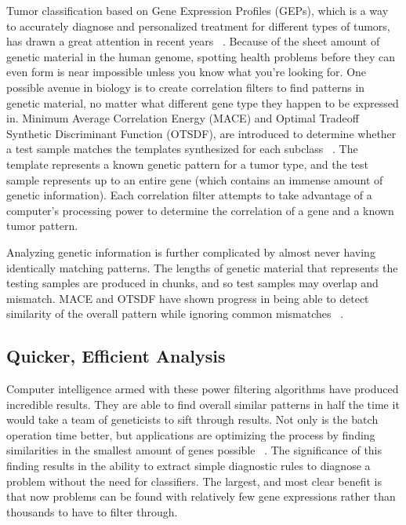 \documentclass[11pt]{article}
\newcommand{\tab}{\hspace*{2em}}
\begin{document}
\begin{doublespace}
\tab Tumor classification based on Gene Expression Profiles (GEPs), which is a way to accurately diagnose 
and personalized treatment for different types of tumors, has drawn a great attention in 
recent years ~\cite{Wang:2012:RCM:2122263.2122454}. Because of the sheet amount of genetic material in the 
human genome, spotting health problems before they can even form is near impossible unless you know what you're looking
for. One possible avenue in biology is to create correlation filters to find patterns in genetic material, no matter what
different gene type they happen to be expressed in. Minimum Average Correlation Energy (MACE) and Optimal Tradeoff Synthetic
Discriminant Function (OTSDF), are introduced to determine whether a test sample matches the templates synthesized for 
each subclass ~\cite{Wang:2012:RCM:2122263.2122454}. The template represents a known genetic pattern for a tumor type, 
and the test sample represents up to an entire
gene (which contains an immense amount of genetic information). Each correlation filter attempts to take advantage of a
computer's processing power to determine the correlation of a gene and a known tumor pattern.

\tab Analyzing genetic information is further complicated by almost never having identically matching patterns. The lengths of 
genetic material that represents the testing samples are produced in chunks, and so test samples may overlap and mismatch. MACE
and OTSDF have shown progress in being able to detect similarity of the overall pattern while ignoring common mismatches
~\cite{Wang:2012:RCM:2122263.2122454}. 

\subsection{Quicker, Efficient Analysis}

\tab Computer intelligence armed with these power filtering algorithms have produced incredible results. They are able to find 
overall similar patterns in half the time it would take a team of geneticists to sift through results. Not only is the batch 
operation time better, but applications are optimizing the process by finding similarities in the smallest amount of genes 
possible ~\cite{Wang:2007:ACC:1229968.1229975}. The significance of this finding results in the ability to extract simple
diagnostic rules to diagnose a problem without the need for classifiers. The largest, and most clear benefit is that now
problems can be found with relatively few gene expressions rather than thousands to have to filter through. 


\end{doublespace}
\end{document}
